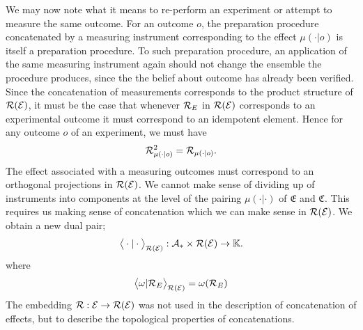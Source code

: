 \documentclass[11pt]{article}
\begin{document}
We may now note what it means to re-perform an experiment or attempt to measure the same outcome. For an outcome $o$, the preparation procedure concatenated by a measuring instrument corresponding to the effect $\mu(\cdot|o)$ is itself a preparation procedure. To such preparation procedure, an application of the same measuring instrument again should not change the ensemble the procedure produces, since the the belief about outcome has already been verified. Since the concatenation of measurements corresponds to the product structure of $\mathcal{R}(\mathcal{E})$, it must be the case that whenever $\mathcal{R}_{E}$ in $\mathcal{R}(\mathcal{E})$ corresponds to an experimental outcome it must correspond to an idempotent element. Hence for any outcome $o$ of an experiment, we must have
$$\mathcal{R}_{\mu(\cdot|o)}^2=\mathcal{R}_{\mu(\cdot|o)}.$$
The effect associated with a measuring outcomes must correspond to an orthogonal projections in $\mathcal{R}(\mathcal{E})$. We cannot make sense of dividing up of instruments into components at the level of the pairing $\mu(\cdot|\cdot)$ of $\mathfrak{E}$ and $\mathfrak{C}$. This requires us making sense of concatenation which we can make sense
in $\mathcal{R}(\mathcal{E})$. We obtain a new dual pair;
\begin{align*}
	\big\langle \cdot|\cdot\big\rangle_{\mathcal{R}(\mathcal{E})} :\mathcal{A}_* \times \mathcal{R}(\mathcal{E})\to \mathbb{K}.
\end{align*}
where $$\big\langle \omega|\mathcal{R}_E\big\rangle_{\mathcal{R}(\mathcal{E})}=\omega(\mathcal{R}_E)$$
The embedding $\mathcal{R}:\mathcal{E}\to \mathcal{R}(\mathcal{E})$ was not used in the description of concatenation of effects, but to describe the topological properties of concatenations.
\end{document}
